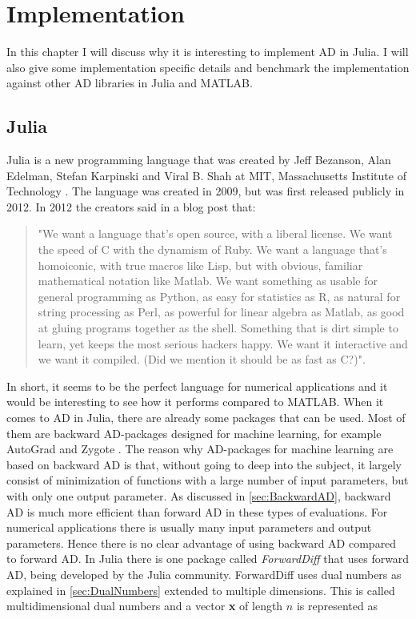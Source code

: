 \chapter{Implementation}
In this chapter I will discuss why it is interesting to implement AD in Julia. I will also give some implementation specific details and benchmark the implementation against other AD libraries in Julia and MATLAB.
\label{ch:Implementation}
\section{Julia}
\label{sec:Julia}
Julia is a new programming language that was created by Jeff Bezanson, Alan Edelman, Stefan Karpinski and Viral B. Shah at MIT, Massachusetts Institute of Technology \emph{\citep{juliaLab}}. The language was created in 2009, but was first released publicly in 2012. In 2012 the creators said in a blog post that:
\begin{quotation}
"We want a language that’s open source, with a liberal license. We want the speed of C with the dynamism of Ruby. We want a language that’s homoiconic, with true macros like Lisp, but with obvious, familiar mathematical notation like Matlab. We want something as usable for general programming as Python, as easy for statistics as R, as natural for string processing as Perl, as powerful for linear algebra as Matlab, as good at gluing programs together as the shell. Something that is dirt simple to learn, yet keeps the most serious hackers happy. We want it interactive and we want it compiled. (Did we mention it should be as fast as C?)"\emph{\citep{juliaBlogRelease2012}}.
\end{quotation}
In short, it seems to be the perfect language for numerical applications and it would be interesting to see how it performs compared to MATLAB. When it comes to AD in Julia, there are already some packages that can be used. Most of them are backward AD-packages designed for machine learning, for example AutoGrad \emph{\citep{knet2016mlsys}} and Zygote \emph{\citep{innes2018don}}. The reason why AD-packages for machine learning are based on backward AD is that, without going to deep into the subject, it largely consist of minimization of functions with a large number of input parameters, but with only one output parameter. As discussed in \autoref{sec:BackwardAD}, backward AD is much more efficient than forward AD in these types of evaluations. For numerical applications there is usually many input parameters and output parameters. Hence there is no clear advantage of using backward AD compared to forward AD. In Julia there is one package called \textit{ForwardDiff} \emph{\citep{ForwardDiff}} that uses forward AD, being developed by the Julia community. ForwardDiff uses dual numbers as explained in \autoref{sec:DualNumbers} extended to multiple dimensions. This is called multidimensional dual numbers and a vector \textbf{x} of length $n$ is represented as
